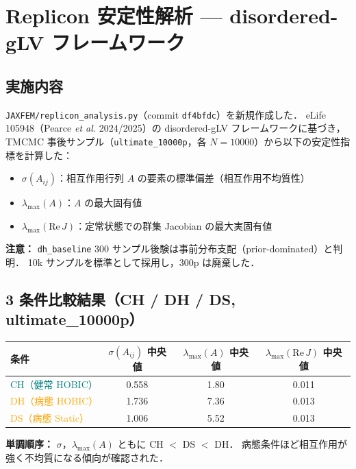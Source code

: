 \documentclass[12pt, a4paper]{article}
\begin{document}
\section{Replicon 安定性解析 — disordered-gLV フレームワーク}

\subsection{実施内容}

\texttt{JAXFEM/replicon\_analysis.py}（commit \texttt{df4bfdc}）を新規作成した．
eLife 105948（Pearce \textit{et al.} 2024/2025）の disordered-gLV フレームワークに基づき，
TMCMC 事後サンプル（\texttt{ultimate\_10000p}，各 $N=10000$）から以下の安定性指標を計算した：

\begin{itemize}[noitemsep]
  \item $\sigma(A_{ij})$：相互作用行列 $A$ の要素の標準偏差（相互作用不均質性）
  \item $\lambda_\mathrm{max}(A)$：$A$ の最大固有値
  \item $\lambda_\mathrm{max}(\mathrm{Re}\,J)$：定常状態での群集 Jacobian の最大実固有値
\end{itemize}

\noindent
\textbf{注意：} \texttt{dh\_baseline} 300 サンプル後験は事前分布支配（prior-dominated）と判明．
10k サンプルを標準として採用し，300p は廃棄した．

\subsection{3 条件比較結果（CH / DH / DS, ultimate\_10000p）}

\begin{center}
\begin{tabular}{lccc}
\toprule
条件 & $\sigma(A_{ij})$ 中央値 & $\lambda_\mathrm{max}(A)$ 中央値 & $\lambda_\mathrm{max}(\mathrm{Re}\,J)$ 中央値 \\
\midrule
\textcolor{teal}{CH（健常 HOBIC）}     & 0.558 & 1.80 & 0.011 \\
\textcolor{orange}{DH（病態 HOBIC）}   & 1.736 & 7.36 & 0.013 \\
\textcolor{orange}{DS（病態 Static）}  & 1.006 & 5.52 & 0.013 \\
\bottomrule
\end{tabular}
\end{center}

\medskip
\noindent
\textbf{単調順序：} $\sigma$，$\lambda_\mathrm{max}(A)$ ともに CH $<$ DS $<$ DH．
病態条件ほど相互作用が強く不均質になる傾向が確認された．
\end{document}
